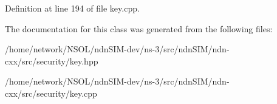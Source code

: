 Definition at line 194 of file key.\+cpp.



The documentation for this class was generated from the following files\+:\begin{DoxyCompactItemize}
\item 
/home/network/\+N\+S\+O\+L/ndn\+S\+I\+M-\/dev/ns-\/3/src/ndn\+S\+I\+M/ndn-\/cxx/src/security/key.\+hpp\item 
/home/network/\+N\+S\+O\+L/ndn\+S\+I\+M-\/dev/ns-\/3/src/ndn\+S\+I\+M/ndn-\/cxx/src/security/key.\+cpp\end{DoxyCompactItemize}
